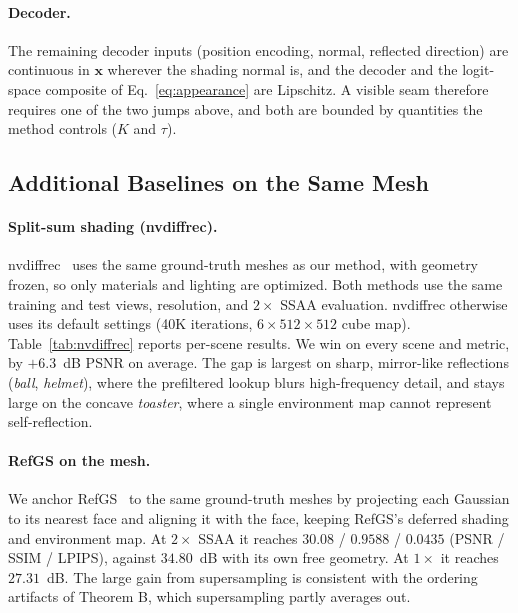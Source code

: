 \begin{addblock}
\paragraph{Decoder.} The remaining decoder inputs (position encoding, normal, reflected direction)
are continuous in $\mathbf{x}$ wherever the shading normal is, and the decoder and the logit-space
composite of Eq.~\eqref{eq:appearance} are Lipschitz. A visible seam therefore requires one of the
two jumps above, and both are bounded by quantities the method controls ($K$ and $\tau$).

\subsection{Additional Baselines on the Same Mesh}
\label{app:baselines}
\paragraph{Split-sum shading (nvdiffrec).} nvdiffrec~\citep{nvdiffrec} uses the same ground-truth
meshes as our method, with geometry frozen, so only materials and lighting are optimized. Both
methods use the same training and test views, resolution, and $2\times$ SSAA evaluation. nvdiffrec
otherwise uses its default settings (40K iterations, $6{\times}512{\times}512$ cube map).
Table~\ref{tab:nvdiffrec} reports per-scene results. We win on every scene and metric, by
$+6.3$~dB PSNR on average. The gap is largest on sharp, mirror-like reflections (\emph{ball},
\emph{helmet}), where the prefiltered lookup blurs high-frequency detail, and stays large on the
concave \emph{toaster}, where a single environment map cannot represent self-reflection.

\paragraph{RefGS on the mesh.} We anchor RefGS~\citep{refgs} to the same ground-truth meshes by
projecting each Gaussian to its nearest face and aligning it with the face, keeping RefGS's deferred
shading and environment map. At $2\times$ SSAA it reaches $30.08$ / $0.9588$ / $0.0435$
(PSNR / SSIM / LPIPS), against $34.80$~dB with its own free geometry. At $1\times$ it reaches
$27.31$~dB. The large gain from supersampling is consistent with the ordering artifacts of Theorem B,
which supersampling partly averages out.



\end{addblock}
